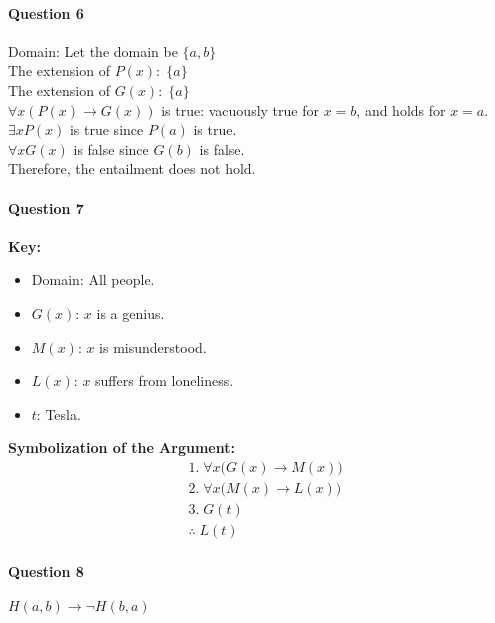 \documentclass[letterpaper,11pt]{article}
\theoremstyle{mytheor}
\begin{document}
\paragraph{Question 6}\phantom{a}
\begin{framed}
    \noindent Domain: Let the domain be $\{a, b\}$ \\

    \noindent The extension of $P(x): \; \{a\}$ \\ 
    The extension of $G(x): \; \{a\}$ \\

    \noindent $\forall x(P(x) \rightarrow G(x))$ is true: vacuously true for $x = b$, and holds for $x = a$.\\
    $\exists x P(x)$ is true since $P(a)$ is true.\\
    $\forall x G(x)$ is false since $G(b)$ is false.\\

    \noindent Therefore, the entailment does not hold.
\end{framed}

\paragraph{Question 7}\phantom{a}
\begin{framed}
    \noindent \textbf{Key:} 
    \begin{itemize}
        \item Domain: All people.
        \item $G(x)$: $x$ is a genius.
        \item $M(x)$: $x$ is misunderstood.
        \item $L(x)$: $x$ suffers from loneliness.
        \item $t$: Tesla.
    \end{itemize}
    
    \noindent \textbf{Symbolization of the Argument:}
    \[
    \begin{aligned}
    &1.\; \forall x \bigl(G(x) \to M(x)\bigr)\\
    &2.\; \forall x \bigl(M(x) \to L(x)\bigr)\\
    &3.\; G(t)\\
    &\therefore \; L(t)
    \end{aligned}
    \]
\end{framed}



\paragraph{Question 8}\phantom{a}
\begin{framed}
    $H(a, b) \to \neg H(b, a)$
\end{framed}
\end{document}
